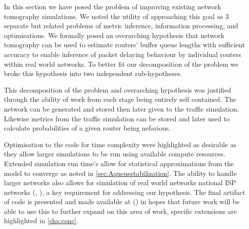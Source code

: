 In this section we have posed the problem of improving existing network tomography simulations. We noted the utility of approaching this goal as 3 separate but related problems of metric inference, information processing, and optimisations. We formally posed an overarching hypothesis that network tomography can be used to estimate routers' buffer queue lengths with sufficient accuracy to enable inference of packet delaying behaviour by individual routers within real world networks. To better fit our decomposition of the problem we broke this hypothesis into two independent sub-hypotheses.\par
This decomposition of the problem and overarching hypothesis was justified through the ability of work from each stage being entirely self contained. The network can be generated and stored then later given to the traffic simulation. Likewise metrics from the traffic simulation can be stored and later used to calculate probabilities of a given router being nefarious.\par
Optimisation to the code for time complexity were highlighted as desirable as they allow larger simulations to be run using available compute resources. Extended simulation run time's allow for statistical approximations from the model to converge as noted in \cref{sec:Aqueuestabilization}. The ability to handle larger networks also allows for simulation of real world networks national ISP networks (\cite{knight_internet_2011}, \cite{orlowski_sndlib_2007}), a key requirement for addressing our hypothesis. The final artifact of code is presented and made available at (\cite{sylvester_millar_real_2021}) in hopes that future work will be able to use this to further expand on this area of work, specific extensions are highlighted in \cref{cha:conc}.